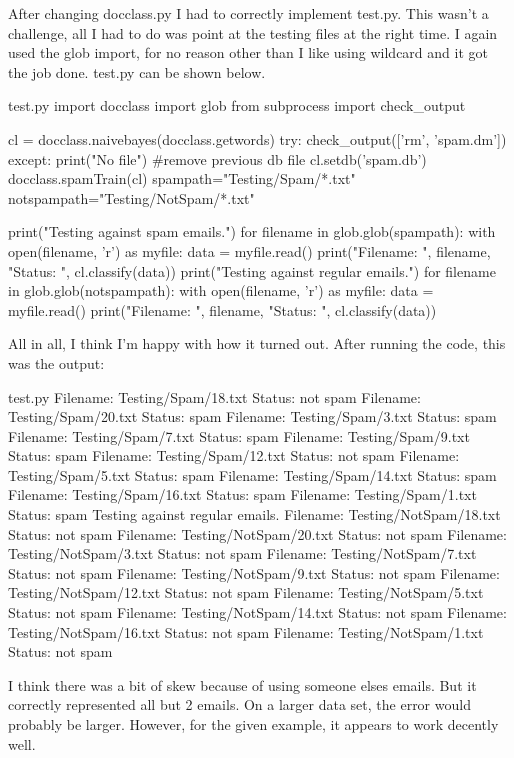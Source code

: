 \documentclass[11pt]{report}
\begin{document}
After changing docclass.py I had to correctly implement test.py. This wasn't a challenge, all I had to do was point at the testing files at the right time. I again used the glob import, for no reason other than I like using wildcard and it got the job done. test.py can be shown below. 
\begin{mylisting}{test.py}
import docclass
import glob
from subprocess import check_output

cl = docclass.naivebayes(docclass.getwords)
try:
  check_output(['rm', 'spam.dm'])
except:
  print("No file")
#remove previous db file
cl.setdb('spam.db')
docclass.spamTrain(cl)
spampath="Testing/Spam/*.txt"
notspampath="Testing/NotSpam/*.txt"

print("Testing against spam emails.")
for filename in glob.glob(spampath):
    with open(filename, 'r') as myfile:
        data = myfile.read()
        print("Filename: ", filename, "Status: ", cl.classify(data))
print("Testing against regular emails.")
for filename in glob.glob(notspampath):
    with open(filename, 'r') as myfile:
        data = myfile.read()
        print("Filename: ", filename, "Status: ", cl.classify(data))
\end{mylisting}

All in all, I think I'm happy with how it turned out. After running the code, this was the output:
\begin{mylisting}{test.py}
Filename:  Testing/Spam/18.txt Status:  not spam
Filename:  Testing/Spam/20.txt Status:  spam
Filename:  Testing/Spam/3.txt Status:  spam
Filename:  Testing/Spam/7.txt Status:  spam
Filename:  Testing/Spam/9.txt Status:  spam
Filename:  Testing/Spam/12.txt Status:  not spam
Filename:  Testing/Spam/5.txt Status:  spam
Filename:  Testing/Spam/14.txt Status:  spam
Filename:  Testing/Spam/16.txt Status:  spam
Filename:  Testing/Spam/1.txt Status:  spam
Testing against regular emails.
Filename:  Testing/NotSpam/18.txt Status:  not spam
Filename:  Testing/NotSpam/20.txt Status:  not spam
Filename:  Testing/NotSpam/3.txt Status:  not spam
Filename:  Testing/NotSpam/7.txt Status:  not spam
Filename:  Testing/NotSpam/9.txt Status:  not spam
Filename:  Testing/NotSpam/12.txt Status:  not spam
Filename:  Testing/NotSpam/5.txt Status:  not spam
Filename:  Testing/NotSpam/14.txt Status:  not spam
Filename:  Testing/NotSpam/16.txt Status:  not spam
Filename:  Testing/NotSpam/1.txt Status:  not spam
\end{mylisting}
	I think there was a bit of skew because of using someone elses emails. But it correctly represented all but 2 emails. On a larger data set, the error would probably be larger. However, for the given example, it appears to work decently well. 
\pagebreak
\end{document}
